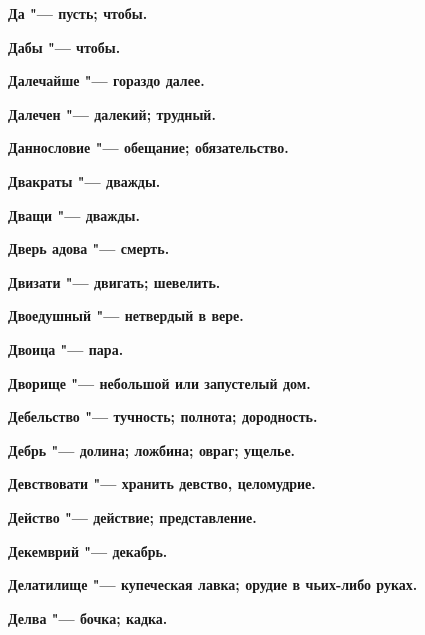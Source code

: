 \begin{mymulticols}{2}
\bfseries Да\normalfont{} "--- пусть; чтобы. 




\bfseries Дабы\normalfont{} "--- чтобы. 




\bfseries Далечайше\normalfont{} "--- гораздо далее. 




\bfseries Далечен\normalfont{} "--- далекий; трудный. 




\bfseries Даннословие\normalfont{} "--- обещание; обязательство. 




\bfseries Двакраты\normalfont{} "--- дважды. 




\bfseries Дващи\normalfont{} "--- дважды. 




\bfseries Дверь адова\normalfont{} "--- смерть. 




\bfseries Двизати\normalfont{} "--- двигать; шевелить. 




\bfseries Двоедушный\normalfont{} "--- нетвердый в вере. 




\bfseries Двоица\normalfont{} "--- пара. 




\bfseries Дворище\normalfont{} "--- небольшой или запустелый дом. 




\bfseries Дебельство\normalfont{} "--- тучность; полнота; дородность. 




\bfseries Дебрь\normalfont{} "--- долина; ложбина; овраг; ущелье. 




\bfseries Девствовати\normalfont{} "--- хранить девство, целомудрие. 




\bfseries Действо\normalfont{} "--- действие; представление. 




\bfseries Декемврий\normalfont{} "--- декабрь. 




\bfseries Делатилище\normalfont{} "--- купеческая лавка; орудие в чьих-либо руках. 




\bfseries Делва\normalfont{} "--- бочка; кадка. 





\end{mymulticols}

